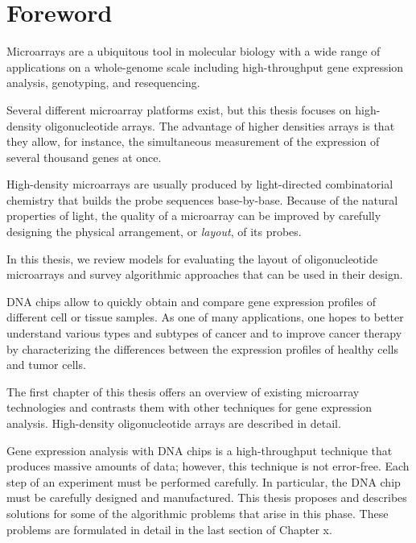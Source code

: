 \chapter*{Foreword}

Microarrays are a ubiquitous tool in molecular biology with a wide range of
applications on a whole-genome scale including high-throughput gene expression
analysis, genotyping, and resequencing.

Several different microarray platforms exist, but this thesis focuses on
high-density oligonucleotide arrays. The advantage of higher densities arrays
is that they allow, for instance, the simultaneous measurement of the expression
of several thousand genes at once.

High-density microarrays are usually produced by light-directed combinatorial
chemistry that builds the probe sequences base-by-base. Because of the natural
properties of light, the quality of a microarray can be improved by carefully
designing the physical arrangement, or \emph{layout}, of its probes.

In this thesis, we review models for evaluating the layout of oligonucleotide
microarrays and survey algorithmic approaches that can be used in their design.


DNA chips allow to quickly obtain and compare gene expression profiles
of different cell or tissue samples. As one of many applications, one
hopes to better understand various types and subtypes of cancer and to
improve cancer therapy by characterizing the differences between
the expression profiles of healthy cells and tumor cells.

The first chapter of this thesis offers an overview of existing
microarray technologies and contrasts them with other techniques for
gene expression analysis. High-density oligonucleotide arrays are
described in detail.

Gene expression analysis with DNA chips is a high-throughput technique
that produces massive amounts of data; however, this technique is not
error-free. Each step of an experiment must be performed carefully. In
particular, the DNA chip must be carefully designed and manufactured.
This thesis proposes and describes solutions for some of the
algorithmic problems that arise in this phase. These problems are
formulated in detail in the last section of Chapter x.


